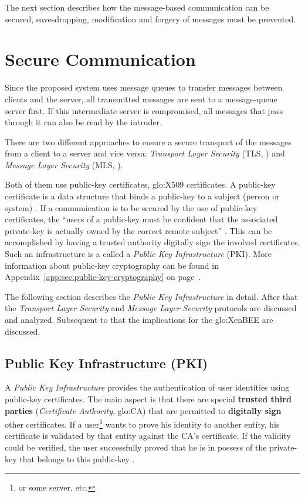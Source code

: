 The  next section  describes how  the message-based  communication  can be
secured, \ie  eavesdropping, modification and forgery of  messages must be
prevented.

\section{Secure Communication}
\label{sec:secure-communication}

Since the proposed system uses message queues to transfer messages between
clients  and  the   server,  all  transmitted  messages  are   sent  to  a
message-queue server  first. If  this intermediate server  is compromised,
all messages that pass through it can also be read by the intruder.

There are  two different  approaches to ensure  a secure transport  of the
messages from a  client to a server and  vice versa: \emph{Transport Layer
  Security} (TLS, \cite{rfc2246})  and \emph{Message Layer Security} (MLS,
\cite{mls, oasis-wss}). 

Both of them use public-key certificates, \eg \gls{glo:X509} certificates.
A public-key certificate is a data  structure that binds a public-key to a
subject (person  or system)  \cite{rfc2459}. If a  communication is  to be
secured by the use of public-key certificates, the ``users of a public-key
must be confident that the associated private-key is actually owned by the
correct  remote subject''  \cite{rfc2459}.   This can  be accomplished  by
having a trusted authority  digitally sign the involved certificates. Such
an infrastructure  is a called  a \emph{Public Key  Infrastructure} (PKI).
More   information  about   public-key  cryptography   can  be   found  in
Appendix~\ref{app:sec:public-key-cryptography}                           on
page~\pageref{app:sec:public-key-cryptography}.

The following  section describes  the \emph{Public Key  Infrastructure} in
detail.  After that the  \emph{Transport Layer Security} and \emph{Message
  Layer  Security} protocols  are discussed  and analyzed.   Subsequent to
that the implications for the \gls{glo:XenBEE} are discussed.

\subsection[Public Key Infrastructure]{Public Key Infrastructure (PKI)}

A  \emph{Public Key  Infrastructure} provides  the authentication  of user
identities using  public-key certificates.  The main aspect  is that there
are special \textbf{trusted  third parties} (\emph{Certificate Authority},
\gls{glo:CA})  that   are  permitted  to   \textbf{digitally  sign}  other
certificates. If a user\footnote{or some server, etc.}  wants to prove his
identity to  another entity, his  certificate is validated by  that entity
against the CA's certificate.  If the validity could be verified, the user
successfully proved that he is  in possess of the private-key that belongs
to this public-key \cite{rfc2459}.

